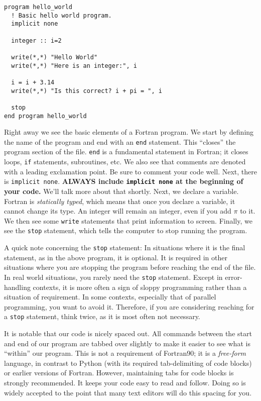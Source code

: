 \documentclass[11pt, letterpaper]{article}
\begin{document}
\begin{verbatim}
program hello_world
  ! Basic hello world program.
  implicit none
  
  integer :: i=2
  
  write(*,*) "Hello World"
  write(*,*) "Here is an integer:", i

  i = i + 3.14
  write(*,*) "Is this correct? i + pi = ", i

  stop
end program hello_world
\end{verbatim}

Right away we see the basic elements of a Fortran program.  We start by
defining the name of the program and end with an {\tt end} statement.  This
``closes'' the program section of the file.  {\tt end} is a fundamental
statement in Fortran; it closes loops, {\tt if} statements, subroutines, etc.
We also see that comments are denoted with a leading exclamation point.
Be sure to comment your code well.  Next, there is \texttt{implicit none}.
\textbf{ALWAYS include \texttt{implicit none} at the beginning of your code.}
We'll talk more about that shortly.  Next, we declare a variable.  Fortran
is \emph{statically typed}, which means that once you declare a variable, it
cannot change its type.  An integer will remain an integer, even if you add
$\pi$ to it.  We then see some \texttt{write} statements that print information
to screen.  Finally, we see the \texttt{stop} statement, which tells the
computer to stop running the program.

A quick note concerning the \texttt{stop} statement: In situations where it is the
final statement, as in the above program, it is optional.  It is required in
other situations where you are stopping the program before reaching the end
of the file.  In real world situations, you rarely need the \texttt{stop}
statement.  Except in error-handling contexts, it is more often a sign of
sloppy programming rather than a situation of requirement.  In some contexts,
especially that of parallel programming, you want to avoid it.  Therefore,
if you are considering reaching for a \texttt{stop} statement, think twice, as it
is most often not necessary.

It is notable that our code is nicely spaced out.  All commands
between the start and end of our program are tabbed over slightly to make it
easier to see what is ``within'' our program.  This is not a requirement of
Fortran90; it is a \emph{free-form} language, in contrast to Python
(with its required tab-delimiting of code blocks) or earlier versions of
Fortran.  However, maintaining tabs for code blocks is strongly recommended.
It keeps your code easy to read and follow.  Doing so is widely accepted to
the point that many text editors will do this spacing for you.
\end{document}
